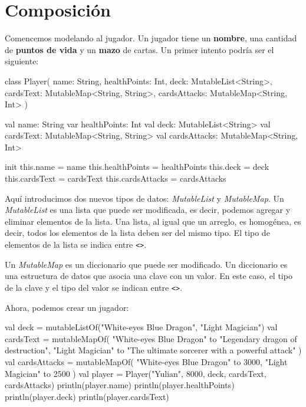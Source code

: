 \section{Composición}

  Comencemos modelando al jugador.
  Un jugador tiene un \textbf{nombre}, una cantidad de \textbf{puntos de vida} y un \textbf{mazo} de 
  cartas.
  Un primer intento podría ser el siguiente:

  \begin{kotlin}
    class Player(
      name: String,
      healthPoints: Int,
      deck: MutableList<String>,
      cardsText: MutableMap<String, String>,
      cardsAttacks: MutableMap<String, Int>
    ) {
      val name: String
      var healthPoints: Int
      val deck: MutableList<String>
      val cardsText: MutableMap<String, String>
      val cardsAttacks: MutableMap<String, Int>

      init {
        this.name = name
        this.healthPoints = healthPoints
        this.deck = deck
        this.cardsText = cardsText
        this.cardsAttacks = cardsAttacks
      }
    }
  \end{kotlin}

  Aquí introducimos dos nuevos tipos de datos: 
  \textit{MutableList}\autocite{MutableListKotlinProgramming} y 
  \textit{MutableMap}.\autocite{MutableMapKotlinProgramming}
  Un \textit{MutableList} es una lista que puede ser modificada, es decir, podemos agregar y
  eliminar elementos de la lista.
  Una lista, al igual que un arreglo, es homogénea, es decir, todos los elementos de la lista
  deben ser del mismo tipo.
  El tipo de elementos de la lista se indica entre \texttt{<>}.

  Un \textit{MutableMap} es un diccionario que puede ser modificado.
  Un diccionario es una estructura de datos que asocia una clave con un valor.
  En este caso, el tipo de la clave y el tipo del valor se indican entre \texttt{<>}.

  Ahora, podemos crear un jugador:

  \begin{kotlin}
    val deck = mutableListOf("White-eyes Blue Dragon", "Light Magician")
    val cardsText = mutableMapOf(
      "White-eyes Blue Dragon" to "Legendary dragon of destruction",
      "Light Magician" to "The ultimate sorcerer with a powerful attack"
    )
    val cardsAttacks = mutableMapOf(
      "White-eyes Blue Dragon" to 3000,
      "Light Magician" to 2500
    )
    val player = Player("Yulian", 8000, deck, cardsText, cardsAttacks)
    println(player.name)
    println(player.healthPoints)
    println(player.deck)
    println(player.cardsText)
  \end{kotlin}

